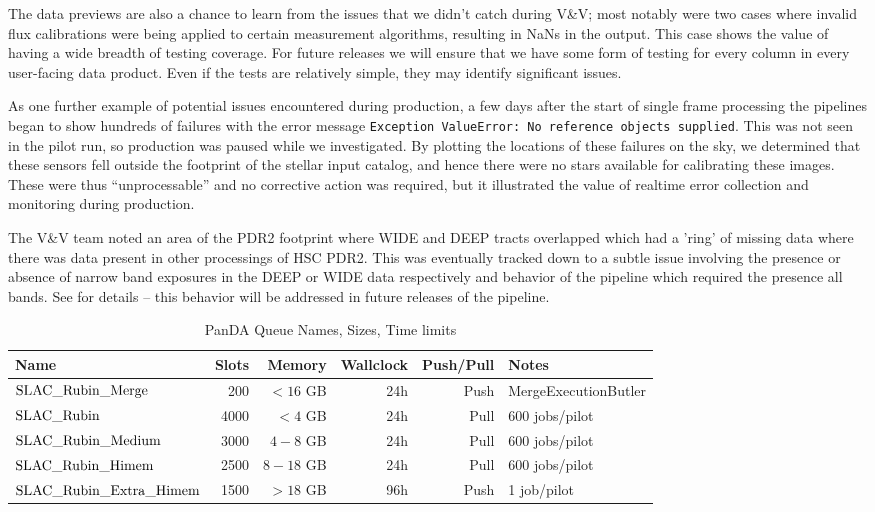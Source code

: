 The data previews are also a chance to learn from the issues that we didn’t catch during V\&V; most
notably were two cases where invalid flux calibrations were being applied to certain measurement
algorithms, resulting in NaNs in the output. This case shows the value of having a wide breadth of
testing coverage. For future releases we will ensure that we have some form of testing for every
column in every user-facing data product. Even if the tests are relatively simple, they may identify
significant issues.

As one further example of potential issues encountered during production, a few days after the start
of single frame processing the pipelines began to show hundreds of failures with the error message
\texttt{Exception ValueError: No reference objects supplied}. This was not seen in the pilot run, so
production was paused while we investigated. By plotting the locations of these failures on the sky,
we determined that these sensors fell outside the footprint of the stellar input catalog, and hence
there were no stars available for calibrating these images. These were thus “unprocessable” and no
corrective action was required, but it illustrated the value of realtime error collection and
monitoring during production.

The V\&V team noted an area of the PDR2 footprint where WIDE and DEEP tracts overlapped which had
a 'ring' of missing data where there was data present in other processings of HSC PDR2.
This was eventually tracked down to a subtle issue involving the presence or absence of narrow band
exposures in the DEEP or WIDE data respectively and behavior of the pipeline which required the
presence all bands.  See  for details -- this behavior will be addressed in future releases
of the pipeline.

\normalsize
\begin{center}
\begin{longtable}{|l|r|r|r|r|l|}
\caption{PanDA Queue Names, Sizes, Time limits} \label{tab:memorynotes}\\
\hline
\textbf{Name}&\textbf{Slots}&\textbf{Memory}&\textbf{Wallclock}&\textbf{Push/Pull}&\textbf{Notes} \\
\hline
$\rm SLAC\_Rubin\_Merge$ & 200 & $<16$ GB & 24h & Push & MergeExecutionButler \\
$\rm SLAC\_Rubin$ & 4000 & $<4$ GB & 24h & Pull & 600 jobs/pilot \\
$\rm SLAC\_Rubin\_Medium$ & 3000 & $4-8$ GB & 24h & Pull &  600 jobs/pilot\\
$\rm SLAC\_Rubin\_Himem$ & 2500& $8-18$ GB & 24h & Pull &  600 jobs/pilot \\
$\rm SLAC\_Rubin\_Extra\_Himem$ & 1500 & $>18$ GB & 96h & Push & 1 job/pilot \\
\hline
\end{longtable}
\end{center}
\normalsize
